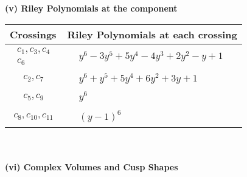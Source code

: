 \documentclass[1p]{elsarticle_modified}
\theoremstyle{definition}
\begin{document}
\newpage\renewcommand{\arraystretch}{1}
\flushleft \textbf{(v) Riley Polynomials at the component}\newline \\
\begin{tabular}{m{50pt}|m{274pt}}
Crossings & \hspace{64pt}Riley Polynomials at each crossing \\
\hline $$\begin{aligned}c_{1},c_{3},c_{4}\\c_{6}\end{aligned}$$&$\begin{aligned}
&y^6-3 y^5+5 y^4-4 y^3+2 y^2- y+1
\end{aligned}$\\
\hline $$\begin{aligned}c_{2},c_{7}\end{aligned}$$&$\begin{aligned}
&y^6+y^5+5 y^4+6 y^2+3 y+1
\end{aligned}$\\
\hline $$\begin{aligned}c_{5},c_{9}\end{aligned}$$&$\begin{aligned}
&y^6
\end{aligned}$\\
\hline $$\begin{aligned}c_{8},c_{10},c_{11}\end{aligned}$$&$\begin{aligned}
&(y-1)^6
\end{aligned}$\\
\hline
\end{tabular}\\~\\
\newpage\flushleft \textbf{(vi) Complex Volumes and Cusp Shapes}
\end{document}
